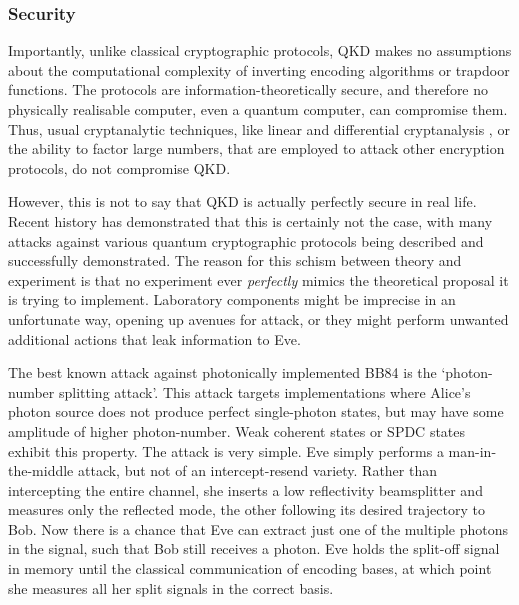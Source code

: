 
%
%

\subsubsection{Security}

Importantly, unlike classical cryptographic protocols, QKD makes no assumptions about the computational complexity of inverting encoding algorithms or trapdoor functions. The protocols are information-theoretically secure, and therefore no physically realisable computer, even a quantum computer, can compromise them. Thus, usual cryptanalytic techniques, like linear and differential cryptanalysis \cite{bib:Schneier96}, or the ability to factor large numbers, that are employed to attack other encryption protocols, do not compromise QKD.

However, this is not to say that QKD is actually perfectly secure in real life. Recent history has demonstrated that this is certainly not the case, with many attacks against various quantum cryptographic protocols being described and successfully demonstrated. The reason for this schism between theory and experiment is that no experiment ever \textit{perfectly} mimics the theoretical proposal it is trying to implement. Laboratory components might be imprecise in an unfortunate way, opening up avenues for attack, or they might perform unwanted additional actions that leak information to Eve.

The best known attack against photonically implemented BB84 is the `photon-number splitting attack'. This attack targets implementations where Alice's photon source does not produce perfect single-photon states, but may have some amplitude of higher photon-number. Weak coherent states or SPDC states exhibit this property. The attack is very simple. Eve simply performs a man-in-the-middle attack, but not of an intercept-resend variety. Rather than intercepting the entire channel, she inserts a low reflectivity beamsplitter and measures only the reflected mode, the other following its desired trajectory to Bob. Now there is a chance that Eve can extract just one of the multiple photons in the signal, such that Bob still receives a photon. Eve holds the split-off signal in memory until the classical communication of encoding bases, at which point she measures all her split signals in the correct basis.

